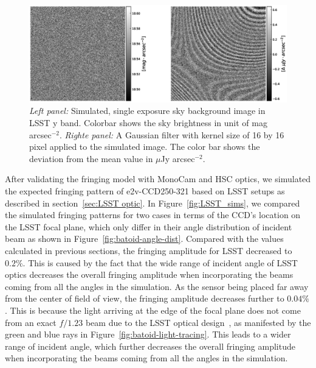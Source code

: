 \documentclass[twocolumn]{aastex63} %
\begin{document}
\begin{CJK*}{UTF8}{gbsn}
\begin{figure}[tbh]
\centering
\includegraphics[scale = 0.42]{LSST-skybg-mag-image.eps}
\caption{{\it Left panel:} Simulated, single exposure sky background image in LSST y band. Colorbar shows the sky brightness in unit of mag arcsec$^{-2}$. {\it Righte panel:} A Gaussian filter with kernel size of 16 by 16 pixel applied to the simulated image.  The color bar shows the deviation from the mean value in $\mu$Jy arcsec$^{-2}$.}
\label{fig:lsst-image}
\end{figure}

After validating the fringing model with MonoCam and HSC optics, we simulated the expected fringing pattern of e2v-CCD250-321 based on LSST setups as described in section~\ref{sec:LSST optic}.  In Figure~\ref{fig:LSST_sims}, we compared the simulated fringing patterns for two cases in terms of the CCD's location on the LSST focal plane, which only differ in their angle distribution of incident beam as shown in Figure~\ref{fig:batoid-angle-dist}. Compared with the values calculated in previous sections, the fringing amplitude for LSST decreased to $0.2\%$. This is caused by the fact that the wide range of incident angle of LSST optics decreases the overall fringing amplitude when incorporating the beams coming from all the angles in the simulation. As the sensor being placed far away from the center of field of view, the fringing amplitude decreases further to $0.04\%$. This is because the light arriving at the edge of the focal plane does not come from an exact $f/1.23$ beam due to the LSST optical design~\citep{Olivier08}, as manifested by the green and blue rays in Figure~\ref{fig:batoid-light-tracing}. This leads to a wider range of incident angle, which further decreases the overall fringing amplitude when incorporating the beams coming from all the angles in the simulation. 


\end{CJK*}
\end{document}
